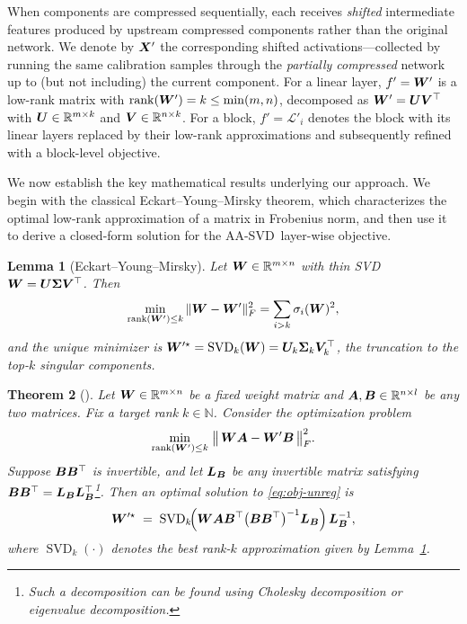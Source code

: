 \documentclass[10pt]{article} %
\newtheorem{theorem}{Theorem}[section]    %
\newtheorem{lemma}[theorem]{Lemma}        %
\theoremstyle{definition}
\theoremstyle{remark}
\newcommand{\ourmethodlight}{{\textsc{AA-SVD}}}
\begin{document}
When components are compressed sequentially, each receives \emph{shifted} intermediate features produced by upstream compressed components rather than the original network.
We denote by ${\bm{X}}'$ the corresponding shifted activations—collected by running the same calibration samples through the \emph{partially compressed} network up to (but not including) the current component.
For a linear layer, $f' = {\bm{W}}'$ is a low-rank matrix with $\mathrm{rank}({\bm{W}}') = k \leq \min(m,n)$, decomposed as ${\bm{W}}' = {\bm{U}}{\bm{V}}^\top$ with ${\bm{U}} \in \mathbb{R}^{m \times k}$ and ${\bm{V}} \in \mathbb{R}^{n \times k}$.
For a block, $f' = \mathcal{L}'_i$ denotes the block with its linear layers replaced by their low-rank approximations and subsequently refined with a block-level objective.

We now establish the key mathematical results underlying our approach.
We begin with the classical Eckart--Young--Mirsky theorem, which characterizes the optimal low-rank approximation of a matrix in Frobenius norm, and then use it to derive a closed-form solution for the \ourmethodlight~layer-wise objective.

\begin{lemma}[Eckart--Young--Mirsky]
\label{lem:eym}
Let ${\bm{W}} \in \mathbb{R}^{m \times n}$ with thin SVD ${\bm{W}} = {\bm{U}}{\bm{\Sigma}}{\bm{V}}^\top$. Then
\[
\min_{\operatorname{rank}({\bm{W}}') \le k} \|{\bm{W}} - {\bm{W}}'\|_F^2 = \sum_{i > k} \sigma_i({\bm{W}})^2,
\]
and the unique minimizer is ${\bm{W}}'^\star = \operatorname{SVD}_k({\bm{W}}) = {\bm{U}}_k{\bm{\Sigma}}_k{\bm{V}}_k^\top$, the truncation to the top-$k$ singular components.
\end{lemma}

\begin{theorem}[]
\label{thm:lowrank-cholesky-unreg}
Let ${\bm{W}}\in\mathbb{R}^{m\times n}$ be a fixed weight matrix and ${\bm{A}},{\bm{B}}\in\mathbb{R}^{n\times l}$ be any two matrices.
Fix a target rank $k\in\mathbb{N}$. Consider the optimization problem
\begin{equation}
\label{eq:obj-unreg}
\min_{\operatorname{rank}({\bm{W}}')\le k}\;\bigl\|\,{\bm{W}}{\bm{A}} - {\bm{W}}'{\bm{B}}\,\bigr\|_F^2.
\end{equation}
Suppose ${\bm{B}}{\bm{B}}^\top$ is invertible, and let ${\bm{L}}_{\bm{B}}$ be any invertible matrix satisfying ${\bm{B}}{\bm{B}}^\top = {\bm{L}}_{\bm{B}}{\bm{L}}_{\bm{B}}^\top$\footnote{Such a decomposition can be found using Cholesky decomposition or eigenvalue decomposition.}.
Then an optimal solution to \eqref{eq:obj-unreg} is
\[
{\bm{W}}'^{\star} \;=\; \operatorname{SVD}_k\!\Bigl({\bm{W}}{\bm{A}}{\bm{B}}^{\top}\bigl({\bm{B}}{\bm{B}}^{\top}\bigr)^{-1}{\bm{L}}_{\bm{B}}\Bigr)\,{\bm{L}}_{\bm{B}}^{-1},
\]
where $\operatorname{SVD}_k(\cdot)$ denotes the best rank-$k$ approximation given by Lemma~\ref{lem:eym}.
\end{theorem}
\end{document}
